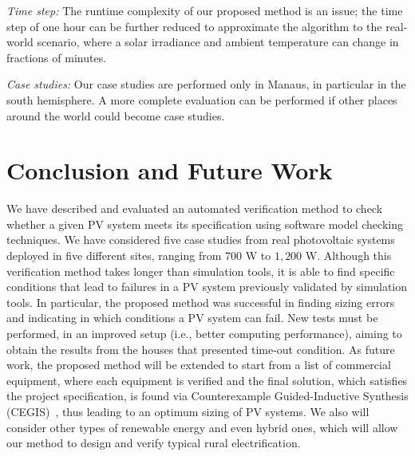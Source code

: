 \documentclass[journal]{IEEEtran}
\begin{document}
\textit{Time step:} The runtime complexity of our proposed method is an issue; the time step of one hour can be further reduced to approximate the algorithm to the real-world scenario, where a solar irradiance and ambient temperature can change in fractions of minutes.

\textit{Case studies:} Our case studies are performed only in Manaus, in particular in the south hemisphere. A more complete evaluation can be performed if other places around the world could become case studies.

\section{Conclusion and Future Work}
\label{sec:Conclusions}
We have described and evaluated an automated verification method to check whether a given PV system meets its specification using software model checking techniques. We have considered five case studies from real photovoltaic systems deployed in five different sites, ranging from $700$ W to $1,200$ W. Although this verification method takes longer than simulation tools, it is able to find specific conditions that lead to failures in a PV system previously validated by simulation tools. In particular, the proposed method was successful in finding sizing errors and indicating in which conditions a PV system can fail. New tests must be performed, in an improved setup (i.e., better computing performance), aiming to obtain the results from the houses that presented time-out condition. As future work, the proposed method will be extended to start from a list of commercial equipment, where each equipment is verified and the final solution, which satisfies the project specification, is found via Counterexample Guided-Inductive Synthesis (CEGIS)~\cite{DBLP:conf/asplos/Solar-LezamaTBSS06}, thus leading to an optimum sizing of PV systems. We also will consider other types of renewable energy and even hybrid ones, which will allow our method to design and verify typical rural electrification.
%
\end{document}
